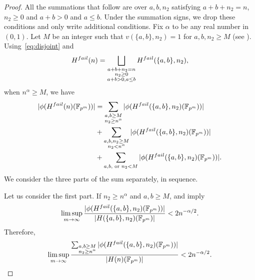 \documentclass[10pt,a4paper]{amsart}
\newcommand\FF{\mathbb{F}}
\begin{document}
\begin{proof}
  All the summations that follow are over \(a,b,n_2\) satisfying \(a+b+n_2 = n\), $n_2\geq 0$ and \(a+b > 0\) and \(a \leq b\).
  Under the summation signs, we drop these conditions and only write additional conditions.
  Fix \(\alpha\) to be any real number in \((0,1)\).
  Let \(M\) be an integer such that \(v(\{a,b\},n_2) = 1\) for \(a,b,n_2 \geq M\) (see ).
  Using~\eqref{eq:disjoint} and
  \[H^{\rm fail}(n) = \bigsqcup_{\substack{a+b+n_2 = n\\ n_2\geq 0 \\ a+b > 0, a \leq b}} H^{\rm fail}(\{a,b\},n_2),\]
  when $n^\alpha\geq M$, we have
  \begin{equation}\label{eqn:3parts}
    \begin{split}
      |\phi(H^{\rm fail}(n)(\FF_{p^m}))| &= \sum_{\substack{a,b \geq M\\ n_2 \geq n^{\alpha}}}|\phi(H^{\rm fail}(\{a,b\},n_2)(\FF_{p^m}))| \\
                                        &+ \sum_{\substack{a, b, n_2 \geq M\\ n_2 < n^{\alpha}}} |\phi (H^{\rm fail}(\{a,b\},n_2)(\FF_{p^m}))| \\
                                        &+ \sum_{a,b,\text{ or } n_2 < M} |\phi (H^{\rm fail}(\{a,b\},n_2)(\FF_{p^m}))|.
    \end{split}
\end{equation}
We consider the three parts of the sum separately, in sequence.

  Let us consider the first part.
  If \(n_2 \geq n^{\alpha}\) and \(a,b \geq M\),  and  imply 
  \[ \limsup_{m \to \infty} \frac{|\phi(H^{\rm fail}(\{a,b\},n_2)(\FF_{p^m}))|}{|H(\{a,b\},n_2)(\FF_{p^m})|}  < 2 n^{-\alpha/2} .\]
  Therefore,    \begin{equation}\label{eqn:part1}
    \limsup_{m \to \infty} \frac{\sum_{\substack{a,b \geq M\\ n_2 \geq n^{\alpha}}}|\phi(H^{\rm fail}(\{a,b\},n_2)(\FF_{p^m}))|}{|H(n)(\FF_{p^m})|}  < 2 n^{-\alpha/2} .
  \end{equation}


\end{proof}
\end{document}
